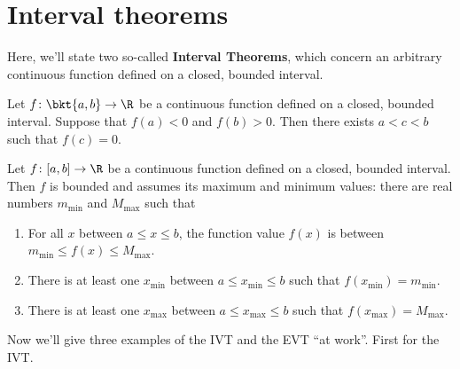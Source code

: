 \documentclass{ccg-topic}
\author{Colton Grainger}
\date{\today}
\begin{document}
\frontstuff

\section{Interval theorems}

Here, we'll state two so-called \textbf{Interval Theorems}, which concern an arbitrary continuous function defined on a closed, bounded interval.

\begin{thm}
    \label{thm:intermediate_value_theorem}
    Let $f \colon \bkt{a,b} \to \R$ be a continuous function defined on a closed, bounded interval. Suppose that $f(a) < 0$ and $f(b) > 0$. Then there exists $a < c < b$ such that $f(c) = 0$.
\end{thm}

\begin{thm}
    \label{thm:extreme_value_theorem}
    Let $f \colon [a,b] \to \R$ be a continuous function defined on a closed, bounded interval. Then $f$ is bounded and assumes its maximum and minimum values: there are real numbers $m_{\mathrm{min}}$ and $M_{\mathrm{max}}$ such that
    \begin{enumerate}
        \item For all $x$ between $a \le x \le b$, the function value $f(x)$ is between $m_{\mathrm{min}} \le f(x) \le M_{\mathrm{max}}$.
        \item There is at least one $x_{\mathrm{min}}$ between $a \le x_{\mathrm{min}} \le b$ such that $f(x_{\mathrm{min}}) = m_{\mathrm{min}}$.
        \item There is at least one $x_{\mathrm{max}}$ between $a \le x_{\mathrm{max}} \le b$ such that $f(x_{\mathrm{max}}) = M_{\mathrm{max}}$.
    \end{enumerate}
\end{thm}

Now we'll give three examples of the IVT and the EVT ``at work''. First for the IVT.
\end{document}
